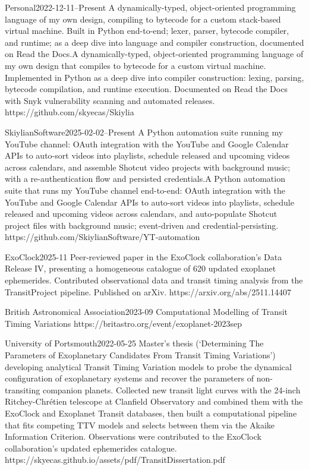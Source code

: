 {Personal}{2022-12-11--Present}
{\iflean A dynamically-typed, object-oriented programming language of my own design, compiling to bytecode for a custom stack-based virtual machine. Built in Python end-to-end; lexer, parser, bytecode compiler, and runtime; as a deep dive into language and compiler construction, documented on Read the Docs.\else A dynamically-typed, object-oriented programming language of my own design that compiles to bytecode for a custom virtual machine. Implemented in Python as a deep dive into compiler construction: lexing, parsing, bytecode compilation, and runtime execution. Documented on Read the Docs with Snyk vulnerability scanning and automated releases.\fi}
{https://github.com/skyecas/Skiylia}

{SkiylianSoftware}{2025-02-02--Present}
{\iflean A Python automation suite running my YouTube channel: OAuth integration with the YouTube and Google Calendar APIs to auto-sort videos into playlists, schedule released and upcoming videos across calendars, and assemble Shotcut video projects with background music; with a re-authentication flow and persisted credentials.\else A Python automation suite that runs my YouTube channel end-to-end: OAuth integration with the YouTube and Google Calendar APIs to auto-sort videos into playlists, schedule released and upcoming videos across calendars, and auto-populate Shotcut project files with background music; event-driven and credential-persisting.\fi}
{https://github.com/SkiylianSoftware/YT-automation}

{ExoClock}{2025-11}
{Peer-reviewed paper in the ExoClock collaboration's Data Release IV, presenting a homogeneous catalogue of 620 updated exoplanet ephemerides. Contributed observational data and transit timing analysis from the TransitProject pipeline. Published on arXiv.}
{https://arxiv.org/abs/2511.14407}

\ifshowextra
{}
{British Astronomical Association}{2023-09}
{Computational Modelling of Transit Timing Variations}
{https://britastro.org/event/exoplanet-2023sep}

{University of Portsmouth}{2022-05-25}
{Master's thesis (`Determining The Parameters of Exoplanetary Candidates From Transit Timing Variations') developing analytical Transit Timing Variation models to probe the dynamical configuration of exoplanetary systems and recover the parameters of non-transiting companion planets. Collected new transit light curves with the 24-inch Ritchey-Chr\'etien telescope at Clanfield Observatory and combined them with the ExoClock and Exoplanet Transit databases, then built a computational pipeline that fits competing TTV models and selects between them via the Akaike Information Criterion. Observations were contributed to the ExoClock collaboration's updated ephemerides catalogue.}
{https://skyecas.github.io/assets/pdf/TransitDissertation.pdf}

